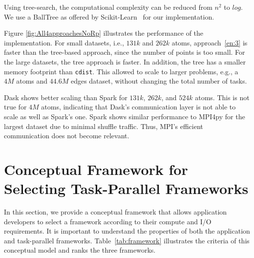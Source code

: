 Using tree-search, the computational complexity can be reduced from $n^2$ to
$log$. We use a BallTree as offered by Scikit-Learn~\cite{scikit-nearest} for
our implementation.

Figure \ref{fig:All4approachesNoRp} illustrates the performance of the
implementation. For small datasets, i.e., $131k$ and $262k$ atoms,
approach~\ref{en:3} is faster than the tree-based approach, since the number of
points is too small. For the large datasets, the tree approach is faster. In
addition, the tree has a smaller memory footprint than \texttt{cdist}. This
allowed to scale to larger problems, e.g., a $4M$ atoms and $44.6M$ edges
dataset, without changing the total number of tasks.

Dask shows better scaling than Spark for $131k$, $262k$, and $524k$ atoms. This
is not true for $4M$ atoms, indicating that Dask's communication layer is not
able to scale as well as Spark's one. Spark shows similar performance to MPI4py
for the largest dataset due to minimal shuffle traffic. Thus, MPI's efficient
communication does not become relevant.

\section{Conceptual Framework for Selecting Task-Parallel Frameworks}
\label{sec:task_sel_model}

In this section, we provide a conceptual framework that allows application
developers to select a framework according to their compute and I/O
requirements. It is important to understand the properties of both the
application and task-parallel frameworks. Table~\ref{tab:framework} illustrates
the criteria of this conceptual model and ranks the three frameworks.

